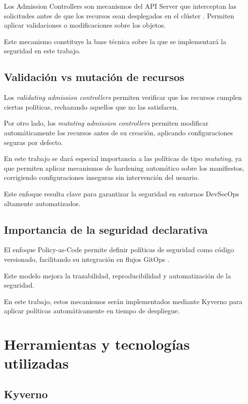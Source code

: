 Los Admission Controllers son mecanismos del API Server que interceptan las solicitudes antes de que los recursos sean desplegados en el clúster \cite{kubernetes_docs}. Permiten aplicar validaciones o modificaciones sobre los objetos.

Este mecanismo constituye la base técnica sobre la que se implementará la seguridad en este trabajo.

\subsection{Validación vs mutación de recursos}

Los \textit{validating admission controllers} permiten verificar que los recursos cumplen ciertas políticas, rechazando aquellos que no las satisfacen.

Por otro lado, los \textit{mutating admission controllers} permiten modificar automáticamente los recursos antes de su creación, aplicando configuraciones seguras por defecto.

En este trabajo se dará especial importancia a las políticas de tipo \textit{mutating}, ya que permiten aplicar mecanismos de hardening automático sobre los manifiestos, corrigiendo configuraciones inseguras sin intervención del usuario.

Este enfoque resulta clave para garantizar la seguridad en entornos DevSecOps altamente automatizados.

\subsection{Importancia de la seguridad declarativa}

El enfoque Policy-as-Code permite definir políticas de seguridad como código versionado, facilitando su integración en flujos GitOps \cite{huttermann2022devops}.

Este modelo mejora la trazabilidad, reproducibilidad y automatización de la seguridad.

En este trabajo, estos mecanismos serán implementados mediante Kyverno para aplicar políticas automáticamente en tiempo de despliegue.

\section{Herramientas y tecnologías utilizadas}

\subsection{Kyverno}

